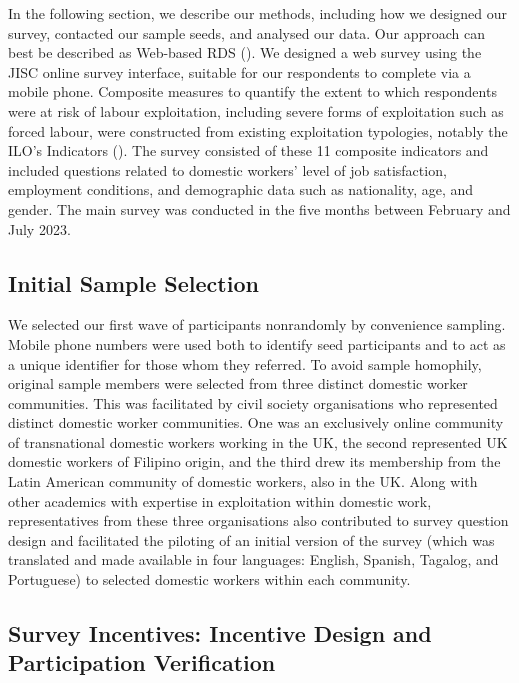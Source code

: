 \documentclass[
  12pt,
  letterpaper,
  DIV=11,
  numbers=noendperiod]{scrartcl}
\theoremstyle{plain}
\theoremstyle{definition}
\begin{document}
In the following section, we describe our methods, including how we
designed our survey, contacted our sample seeds, and analysed our data.
Our approach can best be described as Web-based RDS
(\textcite{wejnert_web-based_2008}). We designed a web survey using the
JISC online survey interface, suitable for our respondents to complete
via a mobile phone. Composite measures to quantify the extent to which
respondents were at risk of labour exploitation, including severe forms
of exploitation such as forced labour, were constructed from existing
exploitation typologies, notably the ILO's Indicators
(\textcite{ILO11-indicators}). The survey consisted of these 11
composite indicators and included questions related to domestic workers'
level of job satisfaction, employment conditions, and demographic data
such as nationality, age, and gender. The main survey was conducted in
the five months between February and July 2023.

\subsection{Initial Sample Selection}\label{initial-sample-selection}

We selected our first wave of participants nonrandomly by convenience
sampling. Mobile phone numbers were used both to identify seed
participants and to act as a unique identifier for those whom they
referred. To avoid sample homophily, original sample members were
selected from three distinct domestic worker communities. This was
facilitated by civil society organisations who represented distinct
domestic worker communities. One was an exclusively online community of
transnational domestic workers working in the UK, the second represented
UK domestic workers of Filipino origin, and the third drew its
membership from the Latin American community of domestic workers, also
in the UK. Along with other academics with expertise in exploitation
within domestic work, representatives from these three organisations
also contributed to survey question design and facilitated the piloting
of an initial version of the survey (which was translated and made
available in four languages: English, Spanish, Tagalog, and Portuguese)
to selected domestic workers within each community.

\subsection{Survey Incentives: Incentive Design and Participation
Verification}\label{survey-incentives-incentive-design-and-participation-verification}
\end{document}
